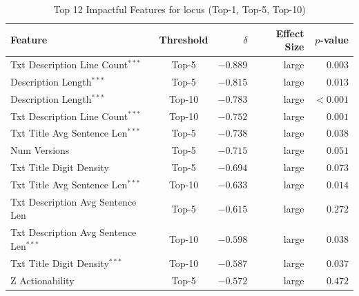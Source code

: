 \begin{table}[h]
\centering
\caption{Top 12 Impactful Features for locus (Top-1, Top-5, Top-10)}
\label{tab:tool_features_locus_combined}
\begin{tabular}{lcrrr}
\toprule
Feature & Threshold & $\delta$ & Effect Size & $p$-value \\
\midrule
Txt Description Line Count$^{***}$ & Top-5 & $-0.889$ & large & $0.003$ \\
Description Length$^{***}$ & Top-5 & $-0.815$ & large & $0.013$ \\
Description Length$^{***}$ & Top-10 & $-0.783$ & large & $<0.001$ \\
Txt Description Line Count$^{***}$ & Top-10 & $-0.752$ & large & $0.001$ \\
Txt Title Avg Sentence Len$^{***}$ & Top-5 & $-0.738$ & large & $0.038$ \\
Num Versions & Top-5 & $-0.715$ & large & $0.051$ \\
Txt Title Digit Density & Top-5 & $-0.694$ & large & $0.073$ \\
Txt Title Avg Sentence Len$^{***}$ & Top-10 & $-0.633$ & large & $0.014$ \\
Txt Description Avg Sentence Len & Top-5 & $-0.615$ & large & $0.272$ \\
Txt Description Avg Sentence Len$^{***}$ & Top-10 & $-0.598$ & large & $0.038$ \\
Txt Title Digit Density$^{***}$ & Top-10 & $-0.587$ & large & $0.037$ \\
Z Actionability & Top-5 & $-0.572$ & large & $0.472$ \\
\bottomrule
\end{tabular}
\end{table}
